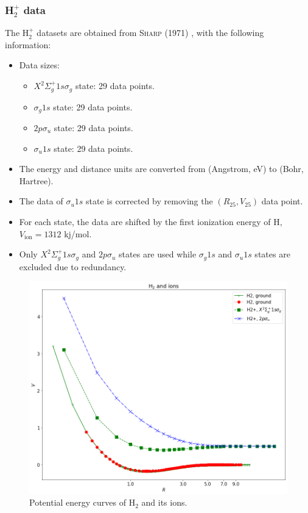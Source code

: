 \documentclass[12pt]{article}
\begin{document}
\subsubsection{H$_2^+$ data}
The H$_2^+$ datasets are obtained from \textsc{Sharp} (1971) \cite{idx172}, with the following information:
\begin{itemize}
    \item Data sizes:
    \begin{itemize}
        \item $X^2\Sigma_g^+ 1s \sigma_g$ state: 29 data points.
        \item $\sigma_g 1s$ state: 29 data points.
        \item $2p \sigma_u$ state: 29 data points.
        \item $\sigma_u 1s$ state: 29 data points.
    \end{itemize}
    \item The energy and distance units are converted from (Angstrom, eV) to (Bohr, Hartree).

    \item The data of $\sigma_u 1s$ state is corrected by removing the $(R_{25}, V_{25})$ data point.
    \item For each state, the data are shifted by the first ionization energy of H, $V_{\text{ion}} = 1312$ kj/mol.
    \item Only $X^2\Sigma_g^+ 1s \sigma_g$ and $2p \sigma_u$ states are used while $\sigma_g 1s$ and $\sigma_u 1s$ states are excluded due to redundancy.
\end{itemize}
\begin{figure}[htbp]
    \centering
    \includegraphics[scale=0.55]{img/H2_and_ions.png}
    \caption{Potential energy curves of H$_2$ and its ions.}
    \label{fig:h2}
\end{figure}
\end{document}
